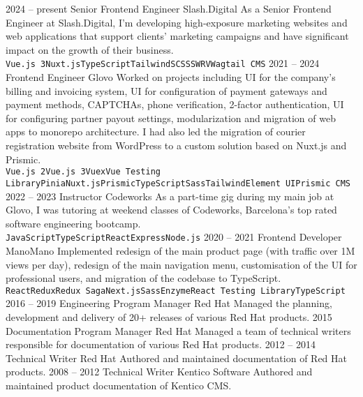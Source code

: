 \documentclass[9pt]{developercv}
\begin{document}

\begin{entrylist}
  \entry
  {2024 --  present}
  {Senior Frontend Engineer}
  {Slash.Digital}
  {As a Senior Frontend Engineer at Slash.Digital, I'm developing high-exposure marketing websites and web applications that support clients' marketing campaigns and have significant impact on the growth of their business.\\ \texttt{Vue.js 3}\slashsep\texttt{Nuxt.js}\slashsep\texttt{TypeScript}\slashsep\texttt{Tailwind}\slashsep\texttt{SCSS}\slashsep\texttt{SWRV}\slashsep\texttt{Wagtail CMS}}
  \entry
  {2021 --  2024}
  {Frontend Engineer}
  {Glovo}
  {Worked on projects including UI for the company's billing and invoicing system, UI for configuration of payment gateways and payment methods, CAPTCHAs, phone verification, 2-factor authentication, UI for configuring partner payout settings, modularization and migration of web apps to monorepo architecture. I had also led the migration of courier registration website from WordPress to a custom solution based on Nuxt.js and Prismic.\\ \texttt{Vue.js 2}\slashsep\texttt{Vue.js 3}\slashsep\texttt{Vuex}\slashsep\texttt{Vue Testing Library}\slashsep\texttt{Pinia}\slashsep\texttt{Nuxt.js}\slashsep\texttt{Prismic}\slashsep\texttt{TypeScript}\slashsep\texttt{Sass}\slashsep\texttt{Tailwind}\slashsep\texttt{Element UI}\slashsep\texttt{Prismic CMS}}
  \entry
  {2022 --  2023}
  {Instructor}
  {Codeworks}
  {As a part-time gig during my main job at Glovo, I was tutoring at weekend classes of Codeworks, Barcelona’s top rated software engineering bootcamp.\\ \texttt{JavaScript}\slashsep\texttt{TypeScript}\slashsep\texttt{React}\slashsep\texttt{Express}\slashsep\texttt{Node.js}}
  \entry
  {2020 -- 2021}
  {Frontend Developer}
  {ManoMano}
  {Implemented redesign of the main product page (with traffic over 1M views per day), redesign of the main navigation menu, customisation of the UI for professional users, and migration of the codebase to TypeScript.\\ \texttt{React}\slashsep\texttt{Redux}\slashsep\texttt{Redux Saga}\slashsep\texttt{Next.js}\slashsep\texttt{Sass}\slashsep\texttt{Enzyme}\slashsep\texttt{React Testing Library}\slashsep\texttt{TypeScript}}
  \entry
  {2016 -- 2019}
  {Engineering Program Manager}
  {Red Hat}
  {Managed the planning, development and delivery of 20+ releases of various Red Hat products. }
  \entry
  {2015}
  {Documentation Program Manager}
  {Red Hat}
  {Managed a team of technical writers responsible for documentation of various Red Hat products. }
  \entry
  {2012 -- 2014}
  {Technical Writer}
  {Red Hat}
  {Authored and maintained documentation of Red Hat products. }
  \entry
  {2008 -- 2012}
  {Technical Writer}
  {Kentico Software}
  {Authored and maintained product documentation of Kentico CMS. }
\end{entrylist}
\end{document}
